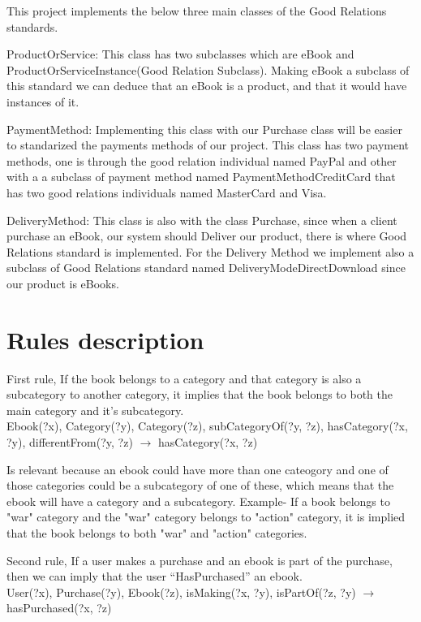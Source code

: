 \documentclass[a4paper,11pt]{article}
\begin{document}
This project implements the below three main classes of the Good Relations standards.

ProductOrService: This class has two subclasses which are eBook and
ProductOrServiceInstance(Good Relation Subclass). Making eBook a subclass of this standard
we can deduce that an eBook is a product, and that it would have instances of it.

PaymentMethod: Implementing this class with our Purchase class will be easier to standarized
the payments methods of our project. This class has two payment methods, one is through the
good relation individual named PayPal and other with a a subclass of payment method named
PaymentMethodCreditCard that has two good relations individuals named MasterCard and Visa.

DeliveryMethod: This class is also with the class Purchase, since when a client purchase an
eBook, our system should Deliver our product, there is where Good Relations standard is
implemented. For the Delivery Method we implement also a subclass of Good Relations standard
named DeliveryModeDirectDownload since our product is eBooks.

\section{Rules description}


First rule, If the book belongs to a category and that category is also a subcategory to another
category, it implies that the book belongs to both the main category and it's subcategory.\\

Ebook(?x), Category(?y), Category(?z), subCategoryOf(?y, ?z), hasCategory(?x, ?y), differentFrom(?y, ?z) $\rightarrow$ hasCategory(?x, ?z)

Is relevant because an ebook could have more than one cateogory and one of those categories could
be a subcategory of one of these, which means that the ebook will have a category and a subcategory.
Example- If a book belongs to "war" category and the "war" category belongs to "action" category,
it is implied that the book belongs to both "war" and "action" categories.

Second rule, If a user makes a purchase and an ebook is part of the purchase, then we can imply that
the user “HasPurchased” an ebook. \\

User(?x), Purchase(?y), Ebook(?z), isMaking(?x, ?y), isPartOf(?z, ?y) $\rightarrow$ hasPurchased(?x, ?z)
\end{document}
